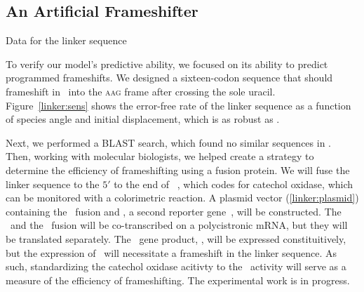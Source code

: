 \documentclass[12pt]{article}
\begin{document}
\subsection{An Artificial Frameshifter}
\label{section:linker}

\begin{cfigure}
  \footnotesize
  \caption{Data for the linker sequence}
\end{cfigure}

To verify our model's predictive ability, we focused on its ability to
predict programmed frameshifts. We designed a sixteen-codon sequence
that should frameshift in \ecoli\ into
the \textsc{aag} frame after crossing the sole uracil.  Figure~\ref{linker:sens}
shows the error-free rate of the linker sequence as a function of species
angle and initial displacement, which is as robust as \prfB.

Next, we performed a BLAST search, which found no similar sequences in 
\ecoli. Then, working with molecular biologists, we helped create a strategy to 
determine the efficiency of frameshifting using a fusion protein. 
We will fuse the linker sequence to the $5'$ to the end of \xylE~\cite{fred1},
which codes for catechol oxidase, which can be monitored with a 
colorimetric reaction.  A plasmid vector (\autoref{linker:plasmid})
containing the \xylE\ fusion and \lacZ, a second reporter gene~\cite{fred2},
will be constructed.  The \lacZ\ and the \xylE\ fusion will be 
co-transcribed on a polycistronic mRNA, but they will be translated
separately.  The \lacZ\ gene product, \bgals, will be expressed constituitively,
but the expression of \xylE\ will necessitate a frameshift in the linker sequence.
As such, standardizing the catechol oxidase acitivty to the \bgals\ activity
will serve as a measure of the efficiency of frameshifting.  The experimental
work is in progress.
\end{document}
